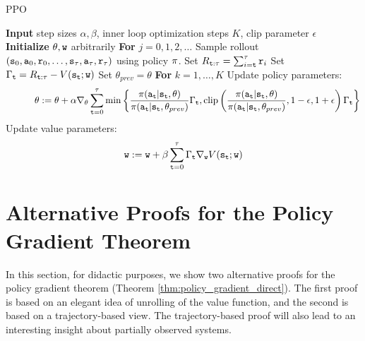 \begin{algorithm}[H]
\caption{PPO}
\begin{algorithmic}[1]
\State \textbf{Input} step sizes $\alpha,\beta$, inner loop optimization steps $K$, clip parameter $\epsilon$
\State \textbf{Initialize} $\theta, {\tt w}$ arbitrarily
\State \textbf{For} $j = 0,1,2,\dots$
\State \quad Sample rollout $({\tt s}_0, {\tt a}_0, {\tt r}_0, \ldots, {\tt s}_\tau, {\tt a}_\tau, {\tt r}_\tau)$ using policy $\pi$.
\State \quad Set $R_{{\tt t}:\tau} = \sum_{i={\tt t}}^\tau {\tt r}_i$
\State \quad Set $\Gamma_{\tt t} = R_{{\tt t}:\tau}-V({\tt s}_{\tt t};{\tt w})$
\State \quad Set $\theta_{prev} = \theta$
\State \quad \textbf{For} $k=1,\dots,K$
\State \quad \quad \quad Update policy parameters:
\[
\quad \quad \quad \theta := \theta + \alpha \nabla_{\theta}\sum_{{\tt t}=0}^\tau \min \left\{\frac{\pi({\tt a}_{\tt t}|{\tt s}_{\tt t}, \theta)}{\pi({\tt a}_{\tt t}|{\tt s}_{\tt t}, \theta_{prev})}\Gamma_{\tt t},  \textrm{clip}\left(\frac{\pi({\tt a}_{\tt t}|{\tt s}_{\tt t}, \theta)}{\pi({\tt a}_{\tt t}|{\tt s}_{\tt t}, \theta_{prev})} , 1-\epsilon, 1+\epsilon\right)\Gamma_{\tt t} \right\}
\]
\State \quad Update value parameters:
\[
{\tt w} := {\tt w} + \beta \sum_{{\tt t}=0}^{\tau} \Gamma_{\tt t} \nabla_{{\tt w}} V({\tt s}_{\tt t};{\tt w})
\]
\end{algorithmic}
\end{algorithm}

\section{Alternative Proofs for the Policy Gradient Theorem}\label{sec:alternative_proof}
In this section, for didactic purposes, we show two alternative proofs for the policy gradient theorem (Theorem \ref{thm:policy_gradient_direct}). The first proof is based on an elegant idea of unrolling of the value function, and the second is based on a trajectory-based view. The trajectory-based proof will also lead to an interesting insight about partially observed systems.

